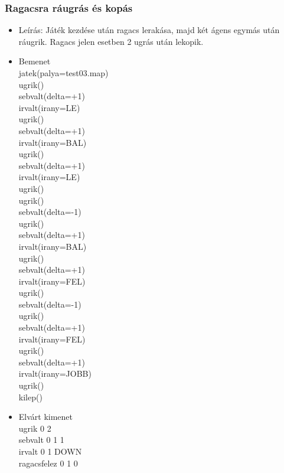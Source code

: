 \subsubsection{Ragacsra ráugrás és kopás}
\begin{itemize}
  \item Leírás: Játék kezdése után ragacs lerakása, majd két ágens egymás után ráugrik. Ragacs jelen esetben 2 ugrás után lekopik.
  \item Bemenet\\
    jatek(palya=test03.map)\\
    ugrik()\\
    sebvalt(delta=+1)\\
    irvalt(irany=LE)\\
    ugrik()\\
    sebvalt(delta=+1)\\
    irvalt(irany=BAL)\\
    ugrik()\\
    sebvalt(delta=+1)\\
    irvalt(irany=LE)\\
    ugrik()\\
    ugrik()\\
    sebvalt(delta=-1)\\
    ugrik()\\
    sebvalt(delta=+1)\\
    irvalt(irany=BAL)\\
    ugrik()\\
    sebvalt(delta=+1)\\
    irvalt(irany=FEL)\\
    ugrik()\\
    sebvalt(delta=-1)\\
    ugrik()\\
    sebvalt(delta=+1)\\
    irvalt(irany=FEL)\\
    ugrik()\\
    sebvalt(delta=+1)\\
    irvalt(irany=JOBB)\\
    ugrik()\\
    kilep()\\
  \item Elvárt kimenet\\
    ugrik 0 2 \\
    sebvalt 0 1 1 \\
    irvalt 0 1 DOWN \\
    ragacsfelez 0 1 0 \\

\end{itemize}
